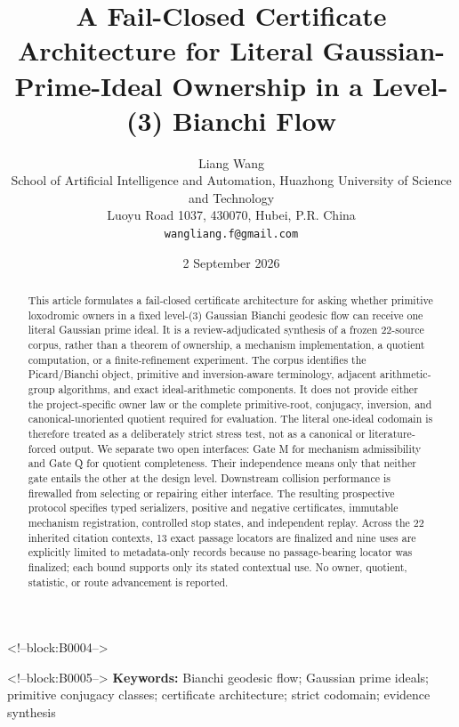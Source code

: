 \documentclass[11pt,a4paper]{article}
\title{A Fail-Closed Certificate Architecture for Literal Gaussian-Prime-Ideal Ownership in a Level-(3) Bianchi Flow}
\author{Liang Wang\\
\small School of Artificial Intelligence and Automation, Huazhong University of Science and Technology\\
\small Luoyu Road 1037, 430070, Hubei, P.R. China\\
\small \texttt{wangliang.f@gmail.com}}
\date{2 September 2026}
\begin{document}
\maketitle

<!--block:B0004-->
\begin{abstract}
This article formulates a fail-closed certificate architecture for asking whether primitive loxodromic owners in a fixed level-(3) Gaussian Bianchi geodesic flow can receive one literal Gaussian prime ideal. It is a review-adjudicated synthesis of a frozen 22-source corpus, rather than a theorem of ownership, a mechanism implementation, a quotient computation, or a finite-refinement experiment. The corpus identifies the Picard/Bianchi object, primitive and inversion-aware terminology, adjacent arithmetic-group algorithms, and exact ideal-arithmetic components. It does not provide either the project-specific owner law or the complete primitive-root, conjugacy, inversion, and canonical-unoriented quotient required for evaluation. The literal one-ideal codomain is therefore treated as a deliberately strict stress test, not as a canonical or literature-forced output. We separate two open interfaces: Gate M for mechanism admissibility and Gate Q for quotient completeness. Their independence means only that neither gate entails the other at the design level. Downstream collision performance is firewalled from selecting or repairing either interface. The resulting prospective protocol specifies typed serializers, positive and negative certificates, immutable mechanism registration, controlled stop states, and independent replay. Across the 22 inherited citation contexts, 13 exact passage locators are finalized and nine uses are explicitly limited to metadata-only records because no passage-bearing locator was finalized; each bound supports only its stated contextual use. No owner, quotient, statistic, or route advancement is reported.
\end{abstract}

<!--block:B0005-->
\noindent\textbf{Keywords:} Bianchi geodesic flow; Gaussian prime ideals; primitive conjugacy classes; certificate architecture; strict codomain; evidence synthesis
\end{document}
